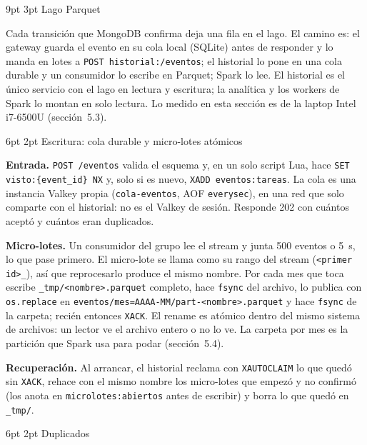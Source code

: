 \documentclass[10pt,letterpaper]{article}
\makeatletter
\renewcommand\section{\@startsection{section}{1}{\z@}%
  {9pt \@plus 2pt \@minus 1pt}{3pt}%
  {\normalfont\large\bfseries\color{acc}}}
\renewcommand\subsection{\@startsection{subsection}{2}{\z@}%
  {6pt \@plus 1pt}{2pt}%
  {\normalfont\normalsize\bfseries\color{acc}}}
\makeatother
\begin{document}
\section{Lago Parquet}

Cada transición que MongoDB confirma deja una fila en el lago. El camino es: el gateway guarda el evento en
su cola local (SQLite) antes de responder y lo manda en lotes a \texttt{POST historial:/eventos}; el
historial lo pone en una cola durable y un consumidor lo escribe en Parquet; Spark lo lee. El historial es el
único servicio con el lago en lectura y escritura; la analítica y los workers de Spark lo montan en solo
lectura. Lo medido en esta sección es de la laptop Intel i7-6500U (sección~5.3).

\subsection{Escritura: cola durable y micro-lotes atómicos}

\textbf{Entrada.} \texttt{POST /eventos} valida el esquema y, en un solo script Lua, hace
\texttt{SET visto:\{event\_id\} NX} y, solo si es nuevo, \texttt{XADD eventos:tareas}. La cola es una
instancia Valkey propia (\texttt{cola-eventos}, AOF \texttt{everysec}), en una red que solo comparte con el
historial: no es el Valkey de sesión. Responde 202 con cuántos aceptó y cuántos eran duplicados.

\textbf{Micro-lotes.} Un consumidor del grupo lee el stream y junta 500 eventos o 5~s, lo que pase primero.
El micro-lote se llama como su rango del stream (\texttt{<primer id>\_<último id>}), así que reprocesarlo
produce el mismo nombre. Por cada mes que toca escribe
\texttt{\_tmp/<nombre>.parquet} completo, hace \texttt{fsync} del archivo, lo publica con
\texttt{os.replace} en \texttt{eventos/mes=AAAA-MM/part-<nombre>.parquet} y hace \texttt{fsync} de la
carpeta; recién entonces \texttt{XACK}. El rename es atómico dentro del mismo sistema de archivos: un lector
ve el archivo entero o no lo ve. La carpeta por mes es la partición que Spark usa para podar (sección~5.4).

\textbf{Recuperación.} Al arrancar, el historial reclama con \texttt{XAUTOCLAIM} lo que quedó sin
\texttt{XACK}, rehace con el mismo nombre los micro-lotes que empezó y no confirmó (los anota en
\texttt{microlotes:abiertos} antes de escribir) y borra lo que quedó en \texttt{\_tmp/}.

\subsection{Duplicados}
\end{document}
